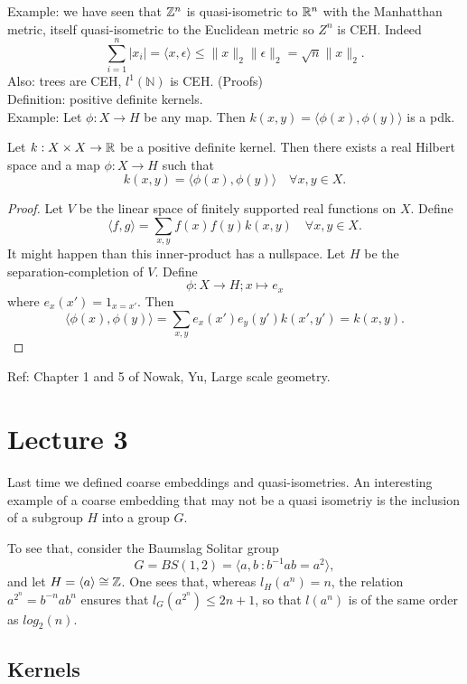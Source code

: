 Example: we have seen that $\mathbb Z^n$ is quasi-isometric to $\mathbb R^n$ with the Manhatthan metric, itself quasi-isometric to the Euclidean metric so $Z^n$ is CEH. Indeed
\[\sum_{i=1}^n |x_i | = \langle x,\epsilon\rangle \leq \| x\|_2 \|\epsilon \|_2 = \sqrt{n} \| x\|_2 .\]
Also: trees are CEH, $l^1(\mathbb N)$ is CEH. (Proofs)\\

Definition: positive definite kernels.\\

Example: Let $\phi: X\rightarrow H$ be any map. Then $k(x,y) = \langle \phi(x) , \phi(y)\rangle $ is a pdk.

\begin{thm}
Let $k: X\times X \rightarrow \mathbb R$ be a positive definite kernel. Then there exists a real Hilbert space and a map $\phi: X \rightarrow H$ such that 
\[k(x,y) = \langle \phi(x) , \phi(y)\rangle  \quad \forall x,y \in X.\]
\end{thm}

\begin{proof}
Let $V$ be the linear space of finitely supported real functions on $X$. Define
\[ \langle f , g \rangle = \sum_{x,y} f(x)f(y) k(x,y) \quad \forall x,y\in X.\]
It might happen than this inner-product has a nullspace. Let $H$ be the separation-completion of $V$.
Define \[\phi : X\rightarrow H ; x \mapsto e_x\]
where $e_x(x') = 1_{x=x'}$. Then
\[ \langle \phi(x) , \phi(y)\rangle = \sum_{x,y} e_x(x')e_y(y') k(x',y') = k(x,y). \] 
\end{proof}

Ref: Chapter 1 and 5 of Nowak, Yu, Large scale geometry.

\section{Lecture 3}

Last time we defined coarse embeddings and quasi-isometries. An interesting example of a coarse embedding that may not be a quasi isometriy is the inclusion of a subgroup $H$ into a group $G$.

To see that, consider the Baumslag Solitar group 
\[G =BS(1,2) = \langle a, b \  : b^{-1}ab = a^2 \rangle ,\]
and let $H = \langle a \rangle \cong \mathbb Z$. One sees that, whereas $l_H(a^n) = n$, the relation $a^{2^n} = b^{-n}a b^n$ ensures that $l_G(a^{2^n}) \leq 2n+ 1$, so that $l(a^n)$ is of the same order as $log_2(n)$. 

\subsection{Kernels}

